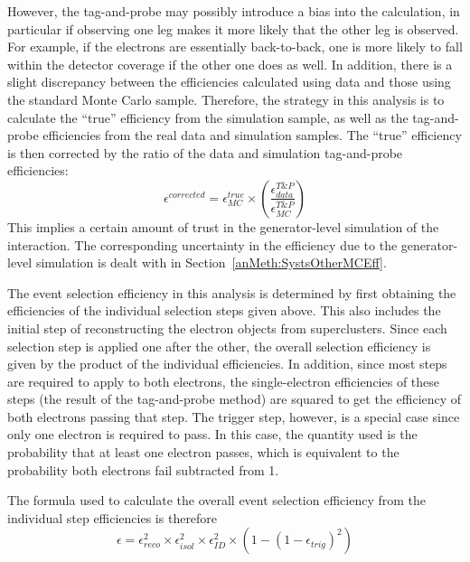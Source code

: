 However, the tag-and-probe may possibly introduce a bias 
into the calculation, 
in particular if observing one leg makes it more likely that 
the other leg is observed. 
For example, if the electrons are essentially back-to-back, 
one is more likely to fall within the detector coverage 
if the other one does as well.  
In addition, there is a slight discrepancy between the efficiencies 
calculated using data and those using the standard Monte Carlo sample.  
Therefore, the strategy in this analysis is to calculate the 
``true'' efficiency from the simulation sample, 
as well as the tag-and-probe efficiencies from the real data 
and simulation samples.  
The ``true'' efficiency is then corrected by the ratio of the 
data and simulation tag-and-probe efficiencies:
\[
\epsilon^{corrected} = \epsilon_{MC}^{true} \times \left( \frac{\epsilon_{data}^{T\&P}}{\epsilon_{MC}^{T\&P}} \right)
\]
This implies a certain amount of trust in the generator-level simulation of the interaction.  
The corresponding uncertainty in the efficiency due to the generator-level simulation 
is dealt with in 
Section~\ref{anMeth:SystsOtherMCEff}.  

The event selection efficiency in this analysis is determined 
by first obtaining the efficiencies of the individual 
selection steps given above.%
This also includes the initial step of reconstructing 
the electron objects from superclusters.  
Since each selection step is applied one after the other, 
the overall selection efficiency is given by the product 
of the individual efficiencies.  
In addition, since most steps are required to apply to both electrons, 
the single-electron efficiencies of these steps 
(the result of the tag-and-probe method)
are squared to get 
the efficiency of both electrons passing that step.  
The trigger step, however, is a special case since only one electron is 
required to pass.  
In this case, the quantity used is the probability that at least 
one electron passes, 
which is equivalent to the probability both electrons fail 
subtracted from 1.  


The formula used to calculate the overall event selection efficiency 
from the individual step efficiencies is therefore 
\[
\epsilon = \epsilon_{reco}^2 \times \epsilon_{isol}^2 \times \epsilon_{ID}^2 \times \left( 1 - \left( 1 - \epsilon_{trig} \right)^2 \right)
\]

